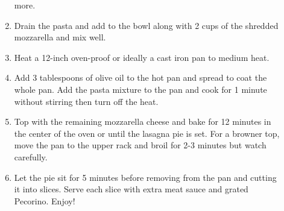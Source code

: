 \documentclass[web-recipes.tex]{subfiles}
\begin{document}
\begin{mdframed}[nobreak]
\begin{minipage}[t]{0.55\textwidth}
\begin{description}
\begin{enumerate}
            more.
          \item Drain the pasta and add to the bowl along with 2
            cups of the shredded mozzarella and mix well.
          \item Heat a 12-inch oven-proof or ideally a cast iron
            pan to medium heat.
          \item Add 3 tablespoons of olive oil to the hot pan and
            spread to coat the whole pan. Add the pasta mixture to
            the pan and cook for 1 minute without stirring then
            turn off the heat.
          \item Top with the remaining mozzarella cheese and bake
            for 12 minutes in the center of the oven or until the
            lasagna pie is set. For a browner top, move the pan to
            the upper rack and broil for 2-3 minutes but watch
            carefully.
          \item Let the pie sit for 5 minutes before removing from
            the pan and cutting it into slices. Serve each slice
            with extra meat sauce and grated Pecorino. Enjoy!
        \end{enumerate}
    \end{description}
  \end{minipage}

  \vspace{3em}
  \centering{\small\ttfamily \myurl}
\end{mdframed}
\end{document}
